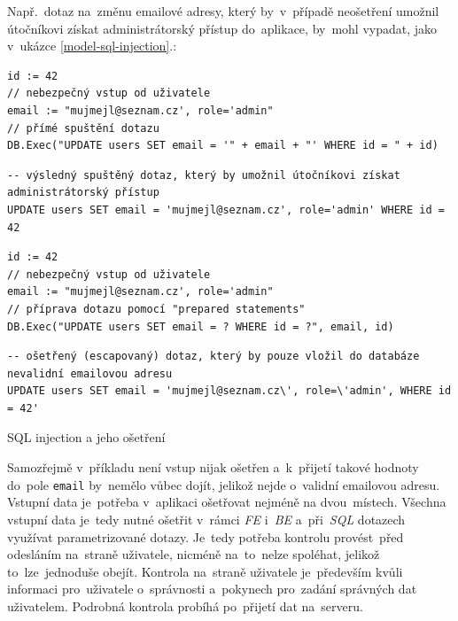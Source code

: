 \documentclass[11pt,a4paper]{report}
\let\oldacrshort\acrshort
\renewcommand{\acrshort}[1]{\emph{\normalsize\color[rgb]{0,0,0}\noindent\oldacrshort{#1}}}
\begin{document}
                Např.~dotaz na~změnu emailové adresy, který by~v~případě neošetření umožnil útočníkovi získat administrátorský přístup do~aplikace, by~mohl vypadat, jako v~ukázce \ref{model-sql-injection}.:
                \begin{code}
                    \centering
                    \begin{minipage}{0.48\textwidth}
                        \begin{verbatim}
id := 42
// nebezpečný vstup od uživatele
email := "mujmejl@seznam.cz', role='admin"
// přímé spuštění dotazu
DB.Exec("UPDATE users SET email = '" + email + "' WHERE id = " + id)
                        \end{verbatim}
                        \begin{verbatim}
-- výsledný spuštěný dotaz, který by umožnil útočníkovi získat administrátorský přístup
UPDATE users SET email = 'mujmejl@seznam.cz', role='admin' WHERE id = 42
                        \end{verbatim}
                        \subcaption{Neošetřený řetězec vložený do \acrshort{SQL}}
                    \end{minipage}
                    \begin{minipage}{0.48\textwidth}
                        \begin{verbatim}
id := 42
// nebezpečný vstup od uživatele
email := "mujmejl@seznam.cz', role='admin"
// příprava dotazu pomocí "prepared statements"
DB.Exec("UPDATE users SET email = ? WHERE id = ?", email, id)
                        \end{verbatim}
                        \begin{verbatim}
-- ošetřený (escapovaný) dotaz, který by pouze vložil do databáze nevalidní emailovou adresu
UPDATE users SET email = 'mujmejl@seznam.cz\', role=\'admin', WHERE id = 42'
                        \end{verbatim}
                    \end{minipage}
                    \caption{SQL injection a jeho ošetření}
                    \label{model-sql-injection}
                \end{code}

                Samozřejmě v~příkladu není vstup nijak ošetřen a~k~přijetí takové hodnoty do~pole \texttt{email} by~nemělo vůbec dojít, jelikož nejde o~validní emailovou adresu. Vstupní data je~potřeba v~aplikaci ošetřovat nejméně na dvou~místech. Všechna vstupní data je~tedy nutné ošetřit v~rámci \acrshort{FE} i~\acrshort{BE} a~při~\acrshort{SQL} dotazech využívat parametrizované dotazy. Je~tedy potřeba kontrolu provést~před odesláním na~straně uživatele, nicméně na~to~nelze spoléhat, jelikož to~lze~jednoduše obejít. Kontrola na~straně uživatele je~především kvůli informaci pro~uživatele o~správnosti a~pokynech pro~zadání správných dat uživatelem. Podrobná kontrola probíhá po~přijetí dat na~serveru.
                
\end{document}
